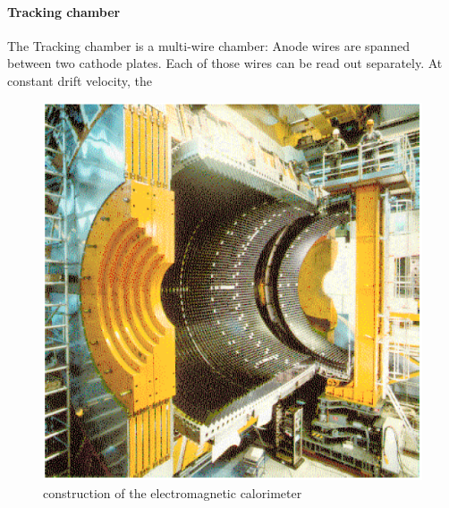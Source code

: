 \paragraph{Tracking chamber}
The Tracking chamber is a multi-wire chamber: Anode wires are spanned between two cathode plates. Each of those wires can be read out separately. At constant drift velocity, the 
\begin{figure}[h]
\centering
\includegraphics[width=1.0\linewidth]{"graphics/elektromagnetisches kaloriemeter"}
\caption[electromagnetic calorimeter]{construction of the electromagnetic calorimeter}
\label{fig:elektromagnetischeskaloriemeter}
\end{figure}
